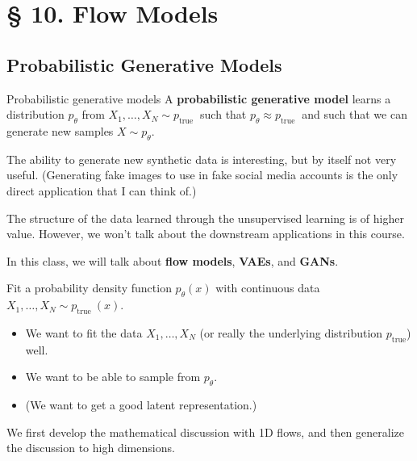 \section{§ 10. Flow Models}

\subsection{Probabilistic Generative Models}

\begin{frame}[allowframebreaks]

\begin{mydefinitionblock}{10.1}{Probabilistic generative models}
    A \textbf{probabilistic generative model} learns a distribution $p_{\theta}$ from $X_{1}, \ldots, X_{N} \sim p_{\text {true }}$ such that $p_{\theta} \approx p_{\text {true }}$ and such that we can generate new samples $X \sim p_{\theta}$.

    The ability to generate new synthetic data is interesting, but by itself not very useful.
    (Generating fake images to use in fake social media accounts is the only direct application that I can think of.)

    The structure of the data learned through the unsupervised learning is of higher value. However, we won't talk about the downstream applications in this course.

    In this class, we will talk about \textbf{flow models}, \textbf{VAEs}, and \textbf{GANs}.
\end{mydefinitionblock}

\end{frame}


\begin{frame}[allowframebreaks]

\par\noindent\textcolor{gray}{\hdashrule{\textwidth}{0.4pt}{1pt 2pt}}

Fit a probability density function $p_{\theta}(x)$ with continuous data $X_{1}, \ldots, X_{N} \sim p_{\text {true }}(x)$.

\begin{itemize}
    \item We want to fit the data $X_{1}, \ldots, X_{N}$ (or really the underlying distribution $p_{\text {true}}$) well.
    \item We want to be able to sample from $p_{\theta}$.
    \item (We want to get a good latent representation.)
\end{itemize}

We first develop the mathematical discussion with 1D flows, and then generalize the discussion to high dimensions.

\end{frame}

